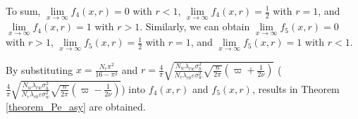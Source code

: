 \documentclass[conference]{IEEEtran}
\begin{document}
To sum, $\mathop {\lim }\limits_{x \to \infty } f_4(x,r)=0$ with $r<1$, $\mathop {\lim }\limits_{x \to \infty } f_4(x,r)=\frac{1}{2}$ with $r=1$, and $\mathop {\lim }\limits_{x \to \infty } f_4(x,r)=1$ with $r>1$. Similarly, we can obtain $\mathop {\lim }\limits_{x \to \infty } f_5(x,r)=0$ with $r>1$, $\mathop {\lim }\limits_{x \to \infty } f_5(x,r)=\frac{1}{2}$ with $r=1$, and $\mathop {\lim }\limits_{x \to \infty } f_5(x,r)=1$ with $r<1$.


By substituting $x \!=\! {\frac{{{N_r}{\pi ^2}}}{{16 - {\pi ^2}}}}$ and $r \!=\! \frac{4}{\pi }\sqrt {\frac{{{N_w}{\lambda _{rw}}\sigma _b^2}}{{{N_r}{\lambda _{rb}}\varepsilon \sigma _w^2}}\sqrt {\frac{n}{{2\pi }}} \left( {\varpi  + \frac{1}{{2\nu }}} \right)}$ ($\frac{4}{\pi }\sqrt {\frac{{{N_w}{\lambda _{rw}}\sigma _b^2}}{{{N_r}{\lambda _{rb}}\varepsilon \sigma _w^2}}\sqrt {\frac{n}{{2\pi }}} \left( {\varpi  - \frac{1}{{2\nu }}} \right)} $) into $f_4(x,r)$ and $f_5(x,r)$, results in Theorem \ref{theorem_Pe_asy} are obtained.

         
   
\vspace{12pt}
\end{document}
